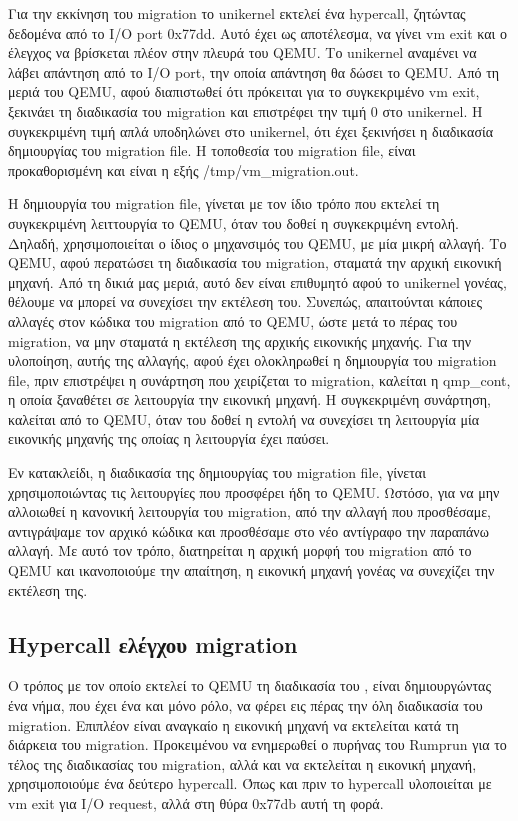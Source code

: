 Για την εκκίνηση του migration το unikernel εκτελεί ένα hypercall, ζητώντας
δεδομένα από το I/O port 0x77dd. Αυτό έχει ως αποτέλεσμα, να γίνει vm exit και ο
έλεγχος να βρίσκεται πλέον στην πλευρά του QEMU. Το unikernel αναμένει να λάβει
απάντηση από το I/O port, την οποία απάντηση θα δώσει το QEMU. Από τη μεριά του
QEMU, αφού διαπιστωθεί ότι πρόκειται για το συγκεκριμένο vm exit, ξεκινάει τη
διαδικασία του migration και επιστρέφει την τιμή 0 στο unikernel. H συγκεκριμένη
τιμή απλά υποδηλώνει στο unikernel, ότι έχει ξεκινήσει η διαδικασία δημιουργίας
του migration file. Η τοποθεσία του migration file, είναι προκαθορισμένη και
είναι η εξής /tmp/vm\_migration.out. 

Η δημιουργία του migration file, γίνεται με τον ίδιο τρόπο που εκτελεί τη
συγκεκριμένη λειττουργία το QEMU, όταν του δοθεί η συγκεκριμένη εντολή. Δηλαδή,
χρησιμοποιείται ο ίδιος ο μηχανσιμός του QEMU, με μία μικρή αλλαγή. Το QEMU,
αφού περατώσει τη διαδικασία του migration, σταματά την αρχική εικονική μηχανή.
Από τη δικιά μας μεριά, αυτό δεν είναι επιθυμητό αφού το unikernel γονέας,
θέλουμε να μπορεί να συνεχίσει την εκτέλεση του. Συνεπώς, απαιτούνται κάποιες
αλλαγές στον κώδικα του migration από το QEMU, ώστε μετά το πέρας του migration,
να μην σταματά η εκτέλεση της αρχικής εικονικής μηχανής. Για την υλοποίηση,
αυτής της αλλαγής, αφού έχει ολοκληρωθεί η δημιουργία του migration file, πριν
επιστρέψει η συνάρτηση που χειρίζεται το migration, καλείται η qmp\_cont, η
οποία ξαναθέτει σε λειτουργία την εικονική μηχανή. Η συγκεκριμένη συνάρτηση, καλείται από το
QEMU, όταν του δοθεί η εντολή να συνεχίσει τη λειτουργία μία εικονικής μηχανής
της οποίας η λειτουργία έχει παύσει. 

Εν κατακλείδι, η διαδικασία της δημιουργίας του migration file, γίνεται
χρησιμοποιώντας τις λειτουργίες που προσφέρει ήδη το QEMU. Ωστόσο, για να μην
αλλοιωθεί η κανονική λειτουργία του migration, από την αλλαγή που προσθέσαμε,
αντιγράψαμε τον αρχικό κώδικα και προσθέσαμε στο νέο αντίγραφο την παραπάνω
αλλαγή. Με αυτό τον τρόπο, διατηρείται η αρχική μορφή του migration από το QEMU
και ικανοποιούμε την απαίτηση, η εικονική μηχανή γονέας να συνεχίζει την
εκτέλεση της. 

\subsection{Hypercall ελέγχου migration}

Ο τρόπος με τον οποίο εκτελεί το QEMU τη διαδικασία του , είναι
δημιουργώντας ένα νήμα, που έχει ένα και μόνο ρόλο, να φέρει εις πέρας την όλη
διαδικασία του migration. Επιπλέον είναι αναγκαίο η εικονική μηχανή να εκτελείται
κατά τη διάρκεια του migration. Προκειμένου να ενημερωθεί ο πυρήνας του Rumprun
για το τέλος της διαδικασίας του migration, αλλά και να εκτελείται η εικονική
μηχανή, χρησιμοποιούμε ένα δεύτερο hypercall. Όπως και πριν το hypercall
υλοποιείται με vm exit για Ι/Ο request, αλλά στη θύρα 0x77db αυτή τη φορά. 

